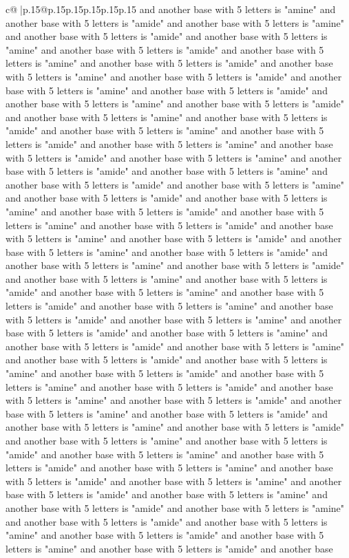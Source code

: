 \documentclass{article}
\begin{document}
{\begin{supertabular}{c@{$\;$}|p{.15\linewidth}@{}p{.15\linewidth}p{.15\linewidth}p{.15\linewidth}p{.15\linewidth}p{.15\linewidth}}
{{{and another base with 5 letters is "amine" and another base with 5 letters is "amide" and another base with 5 letters is "amine" and another base with 5 letters is "amide" and another base with 5 letters is "amine" and another base with 5 letters is "amide" and another base with 5 letters is "amine" and another base with 5 letters is "amide" and another base with 5 letters is "amine" and another base with 5 letters is "amide" and another base with 5 letters is "amine" and another base with 5 letters is "amide" and another base with 5 letters is "amine" and another base with 5 letters is "amide" and another base with 5 letters is "amine" and another base with 5 letters is "amide" and another base with 5 letters is "amine" and another base with 5 letters is "amide" and another base with 5 letters is "amine" and another base with 5 letters is "amide" and another base with 5 letters is "amine" and another base with 5 letters is "amide" and another base with 5 letters is "amine" and another base with 5 letters is "amide" and another base with 5 letters is "amine" and another base with 5 letters is "amide" and another base with 5 letters is "amine" and another base with 5 letters is "amide" and another base with 5 letters is "amine" and another base with 5 letters is "amide" and another base with 5 letters is "amine" and another base with 5 letters is "amide" and another base with 5 letters is "amine" and another base with 5 letters is "amide" and another base with 5 letters is "amine" and another base with 5 letters is "amide" and another base with 5 letters is "amine" and another base with 5 letters is "amide" and another base with 5 letters is "amine" and another base with 5 letters is "amide" and another base with 5 letters is "amine" and another base with 5 letters is "amide" and another base with 5 letters is "amine" and another base with 5 letters is "amide" and another base with 5 letters is "amine" and another base with 5 letters is "amide" and another base with 5 letters is "amine" and another base with 5 letters is "amide" and another base with 5 letters is "amine" and another base with 5 letters is "amide" and another base with 5 letters is "amine" and another base with 5 letters is "amide" and another base with 5 letters is "amine" and another base with 5 letters is "amide" and another base with 5 letters is "amine" and another base with 5 letters is "amide" and another base with 5 letters is "amine" and another base with 5 letters is "amide" and another base with 5 letters is "amine" and another base with 5 letters is "amide" and another base with 5 letters is "amine" and another base with 5 letters is "amide" and another base with 5 letters is "amine" and another base with 5 letters is "amide" and another base with 5 letters is "amine" and another base with 5 letters is "amide" and another base with 5 letters is "amine" and another base with 5 letters is "amide" and another base with 5 letters is "amine" and another base with 5 letters is "amide" and another base with 5 letters is "amine" and another base with 5 letters is "amide" and another base with 5 letters is "amine" and another base with 5 letters is "amide" and another base }}}
\end{supertabular}}
\end{document}
